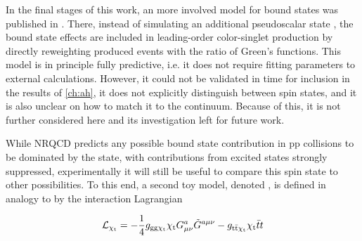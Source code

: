 In the final stages of this work, an more involved model for \ttbar bound states was published in . There, instead of simulating an additional pseudoscalar state \etat, the bound state effects are included in leading-order color-singlet \ttbar production by directly reweighting produced events with the ratio of Green's functions. This model is in principle fully predictive, i.e. it does not require fitting parameters to external calculations. However, it could not be validated in time for inclusion in the results of \cref{ch:ah}, it does not explicitly distinguish between \ttbar spin states, and it is also unclear on how to match it to the \ttbar continuum. Because of this, it is not further considered here and its investigation left for future work.

While NRQCD predicts any possible \ttbar bound state contribution in pp collisions to be dominated by the  state, with contributions from excited states strongly suppressed, experimentally it will still be useful to compare this spin state to other possibilities. To this end, a second toy model, denoted \chit, is defined in analogy to \etat by the interaction Lagrangian

\begin{equation}
  \mathcal{L}_{\mathrm{\chi_t}} = - \frac{1}{4} g_{\mathrm{gg} \mathrm{\chi_t}} \mathrm{\chi_t} G^{a}_{\mu \nu} \tilde{G}^{a \mu \nu} - g_{\mathrm{t \bar{t}} \mathrm{\chi_t}} \mathrm{\chi_t} \bar{t} t
\end{equation}

